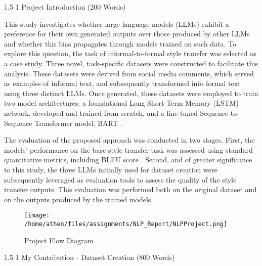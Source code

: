 \documentclass[a4paper,9pt]{scrartcl}
\title{\titletext}
\author{Michael Rice}
\makeatletter
\renewcommand{\section}{\@startsection{section}{1}{0mm}
  {1.5\baselineskip}
  {1\baselineskip} 
  {\normalfont\Large\bfseries}}
\makeatother
\begin{document}
\maketitle
\section{Project Introduction (200 Words)}

This study investigates whether large language models (LLMs) exhibit a preference for their own generated 
outputs over those produced by other LLMs and whether this bias propagates through models trained on such 
data. To explore this question, the task of informal-to-formal style transfer was selected as a case study.
Three novel, task-specific datasets were constructed to facilitate this analysis. 
These datasets were derived from social media comments, which served as examples of informal text, and 
subsequently transformed into formal text using three distinct LLMs. Once generated, these datasets were
employed to train two model architectures: a foundational Long Short-Term Memory (LSTM) network, developed 
and trained from scratch, and a fine-tuned Sequence-to-Sequence Transformer model, BART 
\cite{lewisBARTDenoisingSequencetoSequence2019}.

The evaluation of the proposed approach was conducted in two stages. First, the models' performance on the
base style transfer task was assessed using standard quantitative metrics, including BLEU score 
\cite{papineniBleuMethodAutomatic2002}. Second, and of greater significance to this study, the three 
LLMs initially used for dataset creation were subsequently leveraged as evaluation tools to assess the 
quality of the style transfer outputs. This evaluation was performed both on the original dataset and on 
the outputs produced by the trained models.

\begin{figure}[h]
\centering
\texttt{[image: /home/athen/files/assignments/NLP\_Report/NLPProject.png]}
\caption{Project Flow Diagram}
\label{fig:style_transfer_example}
\end{figure}





\section{My Contribution - Dataset Creation (800 Words)}
\end{document}
